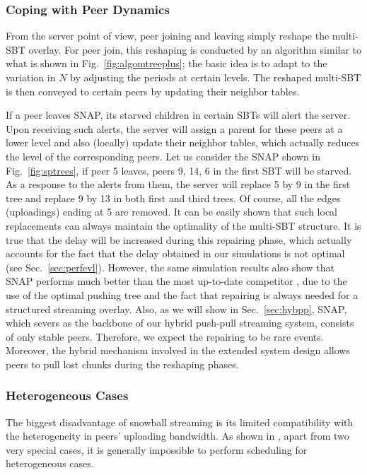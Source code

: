 \documentclass[conference]{IEEEtran}
\begin{document}
\subsubsection{Coping with Peer Dynamics} \label{sec:peerdy}
  From the server point of view, peer joining and leaving simply reshape the multi-SBT overlay. For peer join, this reshaping is conducted by an algorithm similar to what is shown in Fig.~\ref{fig:algomtreeplus}; the basic idea is to adapt to the variation in $N$ by adjusting the periods at certain levels. The reshaped multi-SBT is then conveyed to certain peers by updating their neighbor tables.

  If a peer leaves SNAP, its starved children in certain SBTs will alert the server. Upon receiving such alerts, the server will assign a parent for these peers at a lower level and also (locally) update their neighbor tables, which actually reduces the level of the corresponding peers. Let us consider the SNAP shown in Fig.~\ref{fig:sptrees}, if peer 5 leaves, peers 9, 14, 6 in the first SBT will be starved. As a response to the alerts from them, the server will replace 5 by 9 in the first tree and replace 9 by 13 in both first and third trees. Of course, all the edges (uploadings) ending at 5 are removed. It can be easily shown that such local replacements can always maintain the optimality of the multi-SBT structure. It is true that the delay will be increased during this repairing phase, which actually accounts for the fact that the delay obtained in our simulations is not optimal (see Sec.~\ref{sec:perfevl}). However, the same simulation results also show that SNAP performs much better than the most up-to-date competitor \cite{WangLX-INFOCOM08}, due to the use of the optimal pushing tree and the fact that repairing is always needed for a structured streaming overlay. Also, as we will show in Sec.~\ref{sec:hybpp}, SNAP, which severs as the backbone of our hybrid push-pull streaming system, consists of only stable peers. Therefore, we expect the repairing to be rare events. Moreover, the hybrid mechanism involved in the extended system design allows peers to pull lost chunks during the reshaping phases.

\subsubsection{Heterogeneous Cases} \label{sec:hetero}
  The biggest disadvantage of snowball streaming is its limited compatibility with the heterogeneity in peers' uploading bandwidth. As shown in \cite{Liu-MM07}, apart from two very special cases, it is generally impossible to perform scheduling for heterogeneous cases.
\end{document}
